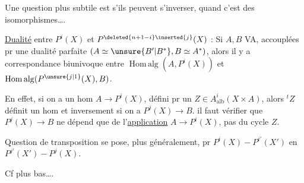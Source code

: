 Une question plus subtile est s'ils peuvent s'inverser, quand c'est des isomorphismes\ldots.

\uline{Dualité} entre \(P^i(X)\) et \(P^{\deleted{n+1-i}\inserted{j}}(X)\)  : Si \(A,B\)   VA,  accouplées pr une dualité parfaite \((A\simeq\unsure{B'|B^*},B\simeq A^*)\), alors il y a correspondance biunivoque entre \(\operatorname{Hom\,alg}(A,P^i(X))\) et \(\operatorname{Hom\,alg}(P^{\unsure{j|1}}(X),B)\).

En effet, si on a un hom \(A\longrightarrow P^i(X)\), défini pr un \(Z\in A^i_{\mathrm{alb}}(X\times A)\), alors \({}^tZ\) définit un hom
et inversement si on a \(P^j(X)\longrightarrow B\). 
il faut vérifier que \(P^j(X)\longrightarrow B\) ne dépend que de l'\uline{application} \(A\longrightarrow P^i(X)\), pas du cycle \(Z\).

Question de transposition se pose, plus généralement, pr \(P^i(X)\mathbin{-}P^{i'}(X')\) en \(P^{j'}(X')\mathbin{-}P^j(X)\).

Cf plus bas\ldots.

